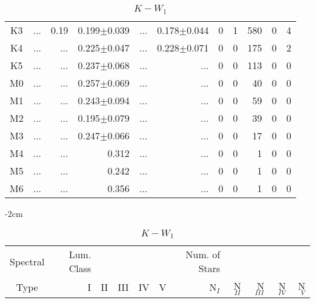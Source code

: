 \begin{table}[t]
\begin{table}[t]
\begin{center}
\begin{tabular}{c|rrrrr|rrrrr}
    K3	&	 ...	&	0.19	&	0.199$\pm$0.039	&	 ...	&	0.178$\pm$0.044	&	0	&	1	&	580	&	0	&	4	\\
    K4	&	 ...	&	 ...	&	0.225$\pm$0.047	&	 ...	&	0.228$\pm$0.071	&	0	&	0	&	175	&	0	&	2	\\
    K5	&	 ...	&	 ...	&	0.237$\pm$0.068	&	 ...	&	 ...	&	0	&	0	&	113	&	0	&	0	\\
    M0	&	 ...	&	 ...	&	0.257$\pm$0.069	&	 ...	&	 ...	&	0	&	0	&	40	&	0	&	0	\\
    M1	&	 ...	&	 ...	&	0.243$\pm$0.094	&	 ...	&	 ...	&	0	&	0	&	59	&	0	&	0	\\
    M2	&	 ...	&	 ...	&	0.195$\pm$0.079	&	 ...	&	 ...	&	0	&	0	&	39	&	0	&	0	\\
    M3	&	 ...	&	 ...	&	0.247$\pm$0.066	&	 ...	&	 ...	&	0	&	0	&	17	&	0	&	0	\\
    M4	&	 ...	&	 ...	&	0.312	&	 ...	&	 ...	&	0	&	0	&	1	&	0	&	0	\\
    M5	&	 ...	&	 ...	&	0.242	&	 ...	&	 ...	&	0	&	0	&	1	&	0	&	0	\\
    M6	&	 ...	&	 ...	&	0.356	&	 ...	&	 ...	&	0	&	0	&	1	&	0	&	0	\\
        \bottomrule
        \end{tabular}
    \end{center}
    \end{table}
    
    \begin{table}[t]
    \tiny
    \centering
    \caption{$K-W_{1}$}
    \begin{center}
        \addtolength{\leftskip} {-2cm}
        \addtolength{\rightskip}{-2cm}
        \begin{tabular}{c|rrrrr|rrrrr}
        \toprule
        Spectral & Lum. Class & & & & & Num. of Stars & & & &  \\
        Type & I & II & III &  IV & V & N$_{I}$ & N$_{II}$ & N$_{III}$ & N$_{IV}$ & N$_{V}$ \\ \midrule
    

\end{tabular}
\end{center}
\end{table}
\end{table}
